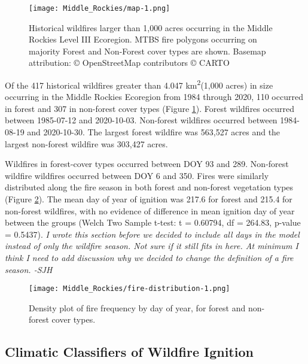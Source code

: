 \documentclass[11pt]{article}
\begin{document}
\begin{figure}[ht]
  \texttt{[image: Middle\_Rockies/map-1.png]}
  \caption{Historical wildfires larger than 1,000 acres occurring in the Middle Rockies Level III Ecoregion. MTBS fire polygons occurring on majority Forest and Non-Forest cover types are shown.  Basemap attribution: © OpenStreetMap contributors © CARTO}
  \label{fig:map}
\end{figure}

Of the 417 historical wildfires greater than 4.047 km\textsuperscript{2}(1,000 acres) in size occurring in the Middle Rockies Ecoregion from 1984 through 2020, 110 occurred in forest and 307 in non-forest cover types (Figure \ref{fig:map}).  Forest wildfires occurred between 1985-07-12 and 2020-10-03.  Non-forest wildfires occurred between 1984-08-19 and 2020-10-30.  The largest forest wildfire was 563,527 acres and the largest non-forest wildfire was 303,427 acres.

Wildfires in forest-cover types occurred between DOY 93 and 289.  Non-forest wildfire wildfires occurred between DOY 6 and 350.  Fires were similarly distributed along the fire season in both forest and non-forest vegetation types (Figure \ref{fig:fire-dens}). The mean day of year of ignition was 217.6 for forest and 215.4 for non-forest wildfires, with no evidence of difference in mean ignition day of year between the groups (Welch Two Sample t-test: t = 0.60794, df = 264.83, p-value = 0.5437). \textit{I wrote this section before we decided to include all days in the model instead of only the wildfire season.  Not sure if it still fits in here.  At minimum I think I need to add discussion why we decided to change the definition of a fire season. -SJH}

\begin{figure}[ht]
  \texttt{[image: Middle\_Rockies/fire-distribution-1.png]}
  \caption{Density plot of fire frequency by day of year, for forest and non-forest cover types.}
  \label{fig:fire-dens}
\end{figure}

\subsection{Climatic Classifiers of Wildfire Ignition}
\end{document}
